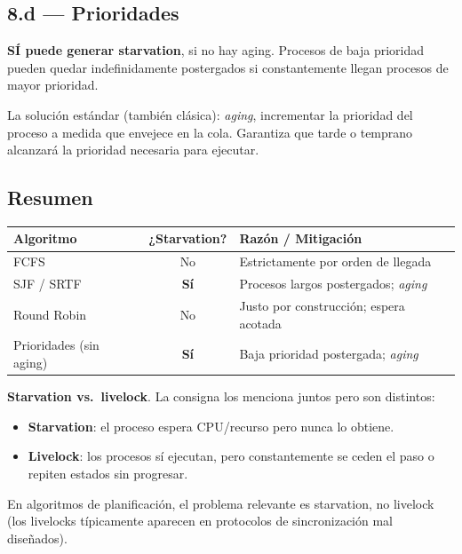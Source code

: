 \documentclass[11pt,a4paper]{article}
\begin{document}
\subsection*{8.d --- Prioridades}

\begin{respuesta}
\textbf{SÍ puede generar starvation}, si no hay aging. Procesos
de baja prioridad pueden quedar indefinidamente postergados si
constantemente llegan procesos de mayor prioridad.

La solución estándar (también clásica): \emph{aging}, incrementar la
prioridad del proceso a medida que envejece en la cola. Garantiza
que tarde o temprano alcanzará la prioridad necesaria para ejecutar.
\end{respuesta}

\subsection*{Resumen}

\begin{center}
\small
\begin{tabular}{@{}lcl@{}}
\toprule
Algoritmo                 & ¿Starvation? & Razón / Mitigación \\
\midrule
FCFS                      & No           & Estrictamente por orden de llegada \\
SJF / SRTF                & \textbf{Sí}  & Procesos largos postergados; \emph{aging} \\
Round Robin               & No           & Justo por construcción; espera acotada \\
Prioridades (sin aging)   & \textbf{Sí}  & Baja prioridad postergada; \emph{aging} \\
\bottomrule
\end{tabular}
\end{center}

\begin{importante}
\textbf{Starvation vs.\ livelock}. La consigna los menciona juntos
pero son distintos:

\begin{itemize}[leftmargin=*,nosep]
    \item \textbf{Starvation}: el proceso espera CPU/recurso pero
        nunca lo obtiene.
    \item \textbf{Livelock}: los procesos sí ejecutan, pero
        constantemente se ceden el paso o repiten estados sin
        progresar.
\end{itemize}

En algoritmos de planificación, el problema relevante es starvation,
no livelock (los livelocks típicamente aparecen en protocolos de
sincronización mal diseñados).
\end{importante}
\end{document}
